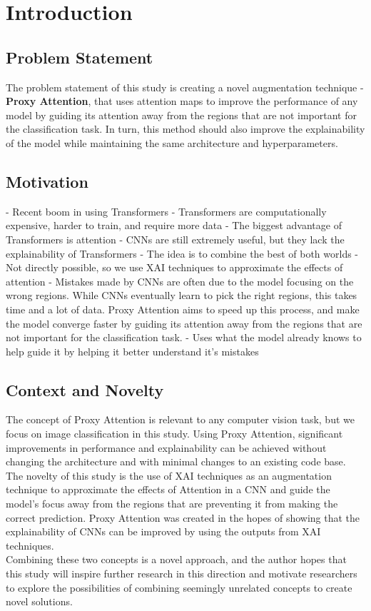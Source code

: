 
\chapter{Introduction}

\section{Problem Statement}
The problem statement of this study is creating a novel augmentation technique - \textbf{Proxy Attention}, that uses attention maps to improve the performance of any model by guiding its attention away from the regions that are not important for the classification task.
In turn, this method should also improve the explainability of the model while maintaining the same architecture and hyperparameters.

\section{Motivation}
- Recent boom in using Transformers
- Transformers are computationally expensive, harder to train, and require more data
- The biggest advantage of Transformers is attention
- CNNs are still extremely useful, but they lack the explainability of Transformers
- The idea is to combine the best of both worlds
- Not directly possible, so we use XAI techniques to approximate the effects of attention
- Mistakes made by CNNs are often due to the model focusing on the wrong regions. While CNNs eventually learn to pick the right regions, this takes time and a lot of data. Proxy Attention aims to speed up this process, and make the model converge faster by guiding its attention away from the regions that are not important for the classification task.
- Uses what the model already knows to help guide it by helping it better understand it's mistakes

\section{Context and Novelty}
The concept of Proxy Attention is relevant to any computer vision task, but we focus on image classification in this study. Using Proxy Attention, significant improvements in performance and explainability can be achieved without changing the architecture and with minimal changes to an existing code base.\\
The novelty of this study is the use of XAI techniques as an augmentation technique to approximate the effects of Attention in a CNN and guide the model's focus away from the regions that are preventing it from making the correct prediction. Proxy Attention was created in the hopes of showing that the explainability of CNNs can be improved by using the outputs from XAI techniques.\\
Combining these two concepts is a novel approach, and the author hopes that this study will inspire further research in this direction and motivate researchers to explore the possibilities of combining seemingly unrelated concepts to create novel solutions.

